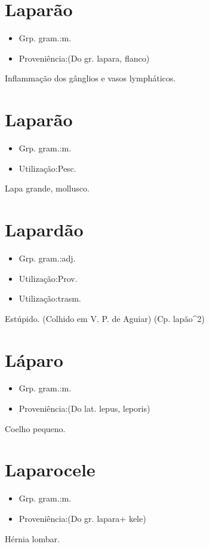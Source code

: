 \section{Laparão}
\begin{itemize}
\item {Grp. gram.:m.}
\end{itemize}
\begin{itemize}
\item {Proveniência:(Do gr. \textunderscore lapara\textunderscore , flanco)}
\end{itemize}
Inflammação dos gânglios e vasos lympháticos.
\section{Laparão}
\begin{itemize}
\item {Grp. gram.:m.}
\end{itemize}
\begin{itemize}
\item {Utilização:Pesc.}
\end{itemize}
Lapa grande, mollusco.
\section{Lapardão}
\begin{itemize}
\item {Grp. gram.:adj.}
\end{itemize}
\begin{itemize}
\item {Utilização:Prov.}
\end{itemize}
\begin{itemize}
\item {Utilização:trasm.}
\end{itemize}
Estúpido. (Colhido em V. P. de Aguiar)
(Cp. \textunderscore lapão\textunderscore ^2)
\section{Láparo}
\begin{itemize}
\item {Grp. gram.:m.}
\end{itemize}
\begin{itemize}
\item {Proveniência:(Do lat. \textunderscore lepus\textunderscore , \textunderscore leporis\textunderscore )}
\end{itemize}
Coelho pequeno.
\section{Laparocele}
\begin{itemize}
\item {Grp. gram.:m.}
\end{itemize}
\begin{itemize}
\item {Proveniência:(Do gr. \textunderscore lapara\textunderscore  + \textunderscore kele\textunderscore )}
\end{itemize}
Hérnia lombar.
